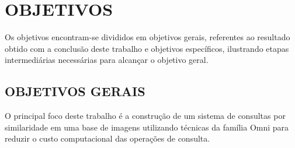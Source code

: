 % 
% 
% 

\section{OBJETIVOS}
\label{sec:objetivos}
Os objetivos encontram-se divididos em objetivos gerais, referentes ao resultado obtido com a conclusão deste trabalho e objetivos específicos, ilustrando etapas intermediárias necessárias para alcançar o objetivo geral.
\subsection{OBJETIVOS GERAIS}
\label{subsec:objger}
O principal foco deste trabalho é a construção de um sistema de consultas por similaridade em uma base de imagens utilizando técnicas da família Omni para reduzir o custo computacional das operações de consulta.

